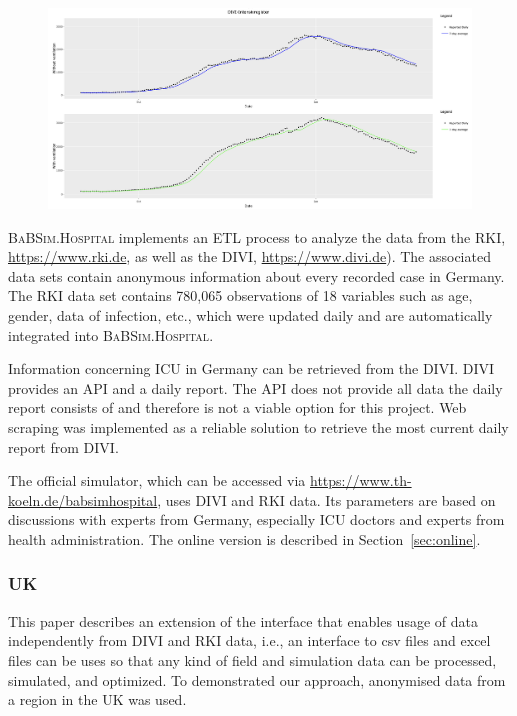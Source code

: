 \documentclass[conference]{IEEEtran}
\newcommand{\babsimhospital}{\textsc{BaBSim.Hospital}\xspace}
\begin{document}
\begin{figure}
    \centering
    \includegraphics[width=0.75\linewidth]{dividata.png}
    \caption{}
\label{fig:divi}
\end{figure}


\babsimhospital implements an \gls{ETL} process to analyze the data from the \gls{RKI}, \url{https://www.rki.de}, as well as the \gls{DIVI}, \url{https://www.divi.de}).
The associated data sets contain anonymous information about every recorded case in Germany. The \gls{RKI} data set contains 
780,065 observations of 18 variables such as age, gender, data of infection, etc., which were updated daily and are automatically integrated into \babsimhospital. 

Information concerning \gls{ICU} in Germany can be retrieved from the \gls{DIVI}.
\gls{DIVI} provides an API and a daily report. The API does not provide all data the daily report consists of and therefore is not a viable option for this project.
Web scraping was implemented as a reliable solution to retrieve the most current daily report from \gls{DIVI}.

The official simulator, which can be accessed via \url{https://www.th-koeln.de/babsimhospital}, uses \gls{DIVI} and \gls{RKI} data.
Its parameters are based on discussions with experts from Germany, especially \gls{ICU} doctors and experts from health administration.
The online version is described in Section~\ref{sec:online}.



\subsubsection{UK}
This paper describes an extension of the interface that enables usage of data independently from \gls{DIVI} and \gls{RKI} data, i.e., an interface to csv files and excel files can be uses so that any kind of field and simulation data can be processed, simulated, and optimized.
To demonstrated our approach, anonymised data from a region in the UK was used. 
\end{document}
